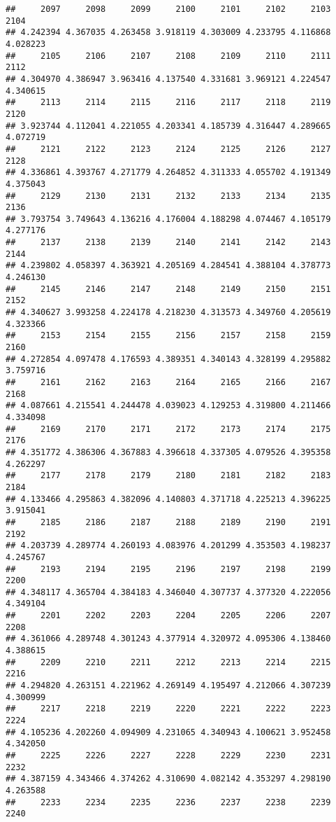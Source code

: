 \documentclass[
]{article}
\begin{document}
\begin{verbatim}
##     2097     2098     2099     2100     2101     2102     2103     2104 
## 4.242394 4.367035 4.263458 3.918119 4.303009 4.233795 4.116868 4.028223 
##     2105     2106     2107     2108     2109     2110     2111     2112 
## 4.304970 4.386947 3.963416 4.137540 4.331681 3.969121 4.224547 4.340615 
##     2113     2114     2115     2116     2117     2118     2119     2120 
## 3.923744 4.112041 4.221055 4.203341 4.185739 4.316447 4.289665 4.072719 
##     2121     2122     2123     2124     2125     2126     2127     2128 
## 4.336861 4.393767 4.271779 4.264852 4.311333 4.055702 4.191349 4.375043 
##     2129     2130     2131     2132     2133     2134     2135     2136 
## 3.793754 3.749643 4.136216 4.176004 4.188298 4.074467 4.105179 4.277176 
##     2137     2138     2139     2140     2141     2142     2143     2144 
## 4.239802 4.058397 4.363921 4.205169 4.284541 4.388104 4.378773 4.246130 
##     2145     2146     2147     2148     2149     2150     2151     2152 
## 4.340627 3.993258 4.224178 4.218230 4.313573 4.349760 4.205619 4.323366 
##     2153     2154     2155     2156     2157     2158     2159     2160 
## 4.272854 4.097478 4.176593 4.389351 4.340143 4.328199 4.295882 3.759716 
##     2161     2162     2163     2164     2165     2166     2167     2168 
## 4.087661 4.215541 4.244478 4.039023 4.129253 4.319800 4.211466 4.334098 
##     2169     2170     2171     2172     2173     2174     2175     2176 
## 4.351772 4.386306 4.367883 4.396618 4.337305 4.079526 4.395358 4.262297 
##     2177     2178     2179     2180     2181     2182     2183     2184 
## 4.133466 4.295863 4.382096 4.140803 4.371718 4.225213 4.396225 3.915041 
##     2185     2186     2187     2188     2189     2190     2191     2192 
## 4.203739 4.289774 4.260193 4.083976 4.201299 4.353503 4.198237 4.245767 
##     2193     2194     2195     2196     2197     2198     2199     2200 
## 4.348117 4.365704 4.384183 4.346040 4.307737 4.377320 4.222056 4.349104 
##     2201     2202     2203     2204     2205     2206     2207     2208 
## 4.361066 4.289748 4.301243 4.377914 4.320972 4.095306 4.138460 4.388615 
##     2209     2210     2211     2212     2213     2214     2215     2216 
## 4.294820 4.263151 4.221962 4.269149 4.195497 4.212066 4.307239 4.300999 
##     2217     2218     2219     2220     2221     2222     2223     2224 
## 4.105236 4.202260 4.094909 4.231065 4.340943 4.100621 3.952458 4.342050 
##     2225     2226     2227     2228     2229     2230     2231     2232 
## 4.387159 4.343466 4.374262 4.310690 4.082142 4.353297 4.298190 4.263588 
##     2233     2234     2235     2236     2237     2238     2239     2240 

\end{verbatim}
\end{document}
